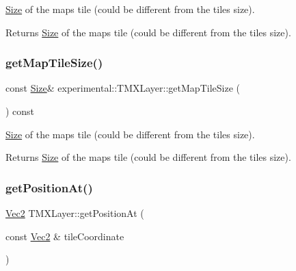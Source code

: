 \hyperlink{classSize}{Size} of the map\textquotesingle{}s tile (could be different from the tile\textquotesingle{}s size).

\begin{DoxyReturn}{Returns}
\hyperlink{classSize}{Size} of the map\textquotesingle{}s tile (could be different from the tile\textquotesingle{}s size). 
\end{DoxyReturn}
\mbox{\label{classexperimental_1_1TMXLayer_a04180a8f4d7d96790212aabc959339de}} 
\subsubsection{\texorpdfstring{get\+Map\+Tile\+Size()}{getMapTileSize()}\hspace{0.1cm}{\footnotesize\ttfamily [2/2]}}
{\footnotesize\ttfamily const \hyperlink{classSize}{Size}\& experimental\+::\+T\+M\+X\+Layer\+::get\+Map\+Tile\+Size (\begin{DoxyParamCaption}{ }\end{DoxyParamCaption}) const\hspace{0.3cm}{\ttfamily [inline]}}

\hyperlink{classSize}{Size} of the map\textquotesingle{}s tile (could be different from the tile\textquotesingle{}s size).

\begin{DoxyReturn}{Returns}
\hyperlink{classSize}{Size} of the map\textquotesingle{}s tile (could be different from the tile\textquotesingle{}s size). 
\end{DoxyReturn}
\mbox{\label{classexperimental_1_1TMXLayer_a3b433e1831ed12ae032db0124f286470}} 
\subsubsection{\texorpdfstring{get\+Position\+At()}{getPositionAt()}\hspace{0.1cm}{\footnotesize\ttfamily [1/2]}}
{\footnotesize\ttfamily \hyperlink{classVec2}{Vec2} T\+M\+X\+Layer\+::get\+Position\+At (\begin{DoxyParamCaption}\item[{const \hyperlink{classVec2}{Vec2} \&}]{tile\+Coordinate }\end{DoxyParamCaption})}

